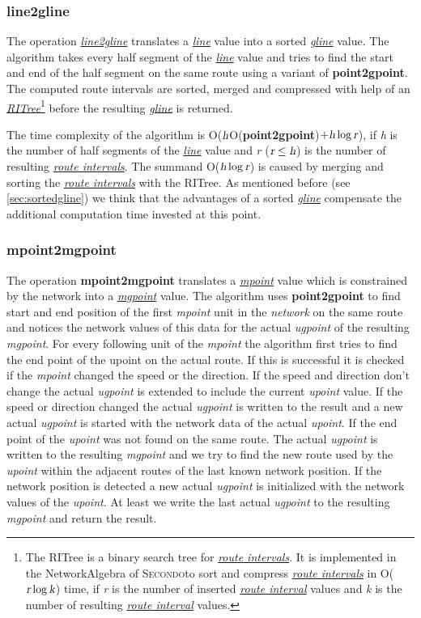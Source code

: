 \documentclass[a4paper]{article}
\newcommand{\secondo}{\textsc{Secondo}}
\newcommand{\op}[1]{\textbf{#1}}
\newcommand{\var}[1]{\textsl{#1}}
\newcommand{\dt}[1]{\textsl{\underline{#1}}}
\begin{document}
\subsubsection{\op{line2gline}}
The operation \dt{line2gline} translates a \dt{line} value into a sorted \dt{gline} value. The algorithm takes every half segment of the \dt{line} value and tries to find the start and end of the half segment on the same route using a variant of \op{point2gpoint}. The computed route intervals are sorted, merged and compressed with help of an \dt{RITree}\label{sec:ritree}\footnote{The RITree is a binary search tree for \dt{route intervals}. It is implemented in the NetworkAlgebra of \secondo{}to sort and compress \dt{route intervals} in O($\var{r} \log \var{k}$)  time, if \var{r} is the number of inserted \dt{route interval} values and \var{k} is the number of resulting \dt{route interval} values.} before the resulting \dt{gline} is returned.

The time complexity of the algorithm is O($\var{h}$O(\op{point2gpoint})$ + \var{h} \log \var{r}$), if \var{h} is the number of half segments of the \dt{line} value and \var{r} ($\var{r} \le \var{h}$) is the number of resulting \dt{route intervals}. The summand O($\var{h} \log \var{r}$) is caused by merging and sorting the \dt{route intervals} with the RITree. As mentioned before (see \ref{sec:sortedgline}) we think that the advantages of a sorted \dt{gline} compensate the additional computation time invested at this point.
\subsubsection{\op{mpoint2mgpoint}}
The operation \op{mpoint2mgpoint} translates a \dt{mpoint} value which is constrained by the network into a \dt{mgpoint} value. The algorithm uses \op{point2gpoint} to find start and end position of the first \var{mpoint} unit in the \var{network} on the same route and notices  the network values of this data for the actual \var{ugpoint} of the resulting \var{mgpoint}. For every following unit of the \var{mpoint} the algorithm first tries to find the end point of the upoint on the actual route. If this is successful it is checked if the \var{mpoint} changed the speed or the direction. If the speed and direction don't change the actual \var{ugpoint} is extended to include the current \var{upoint} value. If the speed or direction changed the actual \var{ugpoint} is written to the result and a new actual \var{ugpoint} is started with the network data of the actual \var{upoint}. If the end point of the \var{upoint} was not found on the same route. The actual \var{ugpoint} is written to the resulting \var{mgpoint} and we try to find the new route used by the \var{upoint} within the adjacent routes of the last known network position. If the network position is detected a new actual \var{ugpoint} is initialized with the network values of the \var{upoint}. At least we write the last actual \var{ugpoint} to the resulting \var{mgpoint} and return the result.
\end{document}
